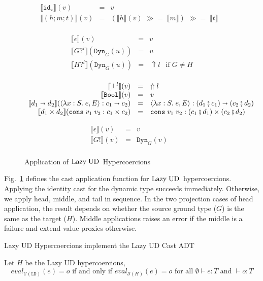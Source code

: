 \documentclass[runningheads]{llncs}
\newcommand{\sidecond}[1]{\text{if}\;#1}
\newcommand{\figequalto}[3]{#1 & = & #2 & #3 \\}
\newcommand{\LUD}{\ensuremath{\text{Lazy\;UD}}}
\newcommand{\CMachine}[1]{\ensuremath{\mathcal{C}(#1)}}
\newcommand{\LDMachine}{\CMachine{\BLD}}
\newcommand{\SMachine}[1]{\ensuremath{\mathcal{S}(#1)}}
\newcommand{\error}[1]{\ensuremath{\Uparrow#1}}
\newcommand{\Tdyn}[0]{\ensuremath{\star}}
\newcommand{\Pbool}[0]{\ensuremath{\mathtt{Bool}}}
\newcommand{\Pfunc}[2]{\ensuremath{#1 \shortrightarrow #2}}
\newcommand{\Pprod}[2]{\ensuremath{#1 \times #2}}
\newcommand{\elam}[3]{\lambda#1:#2.\;#3}
\newcommand{\econs}[2]{\mathtt{cons} \; #1 \; #2}
\newcommand{\ecast}[2]{\ensuremath{#1 : #2}}
\newcommand{\vdyn}[2]{\mathtt{Dyn}_{#1}(#2)}
\newcommand{\vfunc}[4]{\langle\elam{#1}{#2}{#3},#4\rangle}
\newcommand{\vcons}[2]{\econs{#1}{#2}}
\newcommand{\BLD}[0]{\ensuremath{\mathtt{LD}}}
\newcommand{\cnfid}[1]{\ensuremath{\mathtt{id}_{#1}}}
\newcommand{\hcci}[0]{\cnfid{\Tdyn}}
\newcommand{\hccc}[3]{\ensuremath{(#1;#2;#3)}}
\newcommand{\hche}[0]{\ensuremath{\epsilon}}
\newcommand{\hchp}[2]{\ensuremath{#1?^{#2}}}
\newcommand{\hcmbool}[0]{\Pbool}
\newcommand{\hcmfunc}[2]{\Pfunc{#1}{#2}}
\newcommand{\hcmprod}[2]{\Pprod{#1}{#2}}
\newcommand{\hcmfail}[1]{\ensuremath{\bot^l}}
\newcommand{\hcte}[0]{\ensuremath{\epsilon}}
\newcommand{\hcti}[1]{\ensuremath{#1!}}
\newcommand{\mbind}[0]{\ensuremath{\;\gg=\;}}
\newcommand{\denote}[1]{\ensuremath{\llbracket #1 \rrbracket}}
\newcommand{\compose}[2]{\ensuremath{#1 \fatsemi #2}}
\newcommand{\expressiontyping}[3]{\ensuremath{#1 \vdash #2 : #3}}
\newcommand{\valuetyping}[2]{\ensuremath{\vdash #1 : #2}}
\newcommand{\withmachineevalto}[3]{\ensuremath{\mathit{eval}_{#1}(#2)=#3}}
\newcommand{\machineequiv}[2]{
	\ensuremath{
		\withmachineevalto{#1}{e}{o}	
		\text{ if and only if }
		\withmachineevalto{#2}{e}{o}
		\text{ for all }
		\expressiontyping{\emptyset}{e}{T}
		\text{ and }
		\valuetyping{o}{T}
	}}
\begin{document}
\begin{figure}[tp]
	\fbox{$\denote{c}_c(v)=r$}
	\[
	\begin{array}{rclr}
	\figequalto{\denote{\hcci}(v)}{v}{}
	\figequalto{\denote{\hccc{h}{m}{t}}(v)}{
		(\denote{h}(v) \mbind \denote{m})
		\mbind \denote{t}
	}{}
	\end{array}
	\]
	
	\fbox{$\denote{h}_h(v)=r$}
	\[
	\begin{array}{rclr}
	\figequalto{\denote{\hche}(v)}{v}{}
	\figequalto{\denote{\hchp{G}{l}}(\vdyn{G}{u})}{u}{}
	\figequalto{\denote{\hchp{H}{l}}(\vdyn{G}{u})}{\error{l}}{
		\sidecond{G \neq H}
	}
	\end{array}
	\]
	
	\fbox{$\denote{m}_m(v)=r$}
	\[
	\begin{array}{rclr}
	\figequalto{\denote{\hcmfail{l}}(v)}{\error{l}}{}
	\figequalto{\denote{\hcmbool}(v)}{v}{}
	\figequalto{\denote{\hcmfunc{d_1}{d_2}}(\ecast{\vfunc{x}{S}{e}{E}}{\Pfunc{c_1}{c_2}})}{
		\ecast{\vfunc{x}{S}{e}{E}}{\Pfunc{(\compose{d_1}{c_1})}{(\compose{c_2}{d_2})}}
	}{}
	\figequalto{\denote{\hcmprod{d_1}{d_2}}(\ecast{\vcons{v_1}{v_2}}{\Pprod{c_1}{c_2}})}{
		\ecast{\vcons{v_1}{v_2}}{\Pprod{(\compose{c_1}{d_1})}{(\compose{c_2}{d_2})}}
	}{}
	\end{array}
	\]
	
	\fbox{$\denote{t}_t(v)=r$}
	\[
	\begin{array}{rclr}
	\figequalto{\denote{\hcte}(v)}{v}{}
	\figequalto{\denote{\hcti{G}}(v)}{\vdyn{G}{v}}{}
	\end{array}
	\]
	\caption{Application of \LUD\ Hypercoercions}
	\label{fig:LazyUD-Hypercoercions-application}
\end{figure}

Fig.~\ref{fig:LazyUD-Hypercoercions-application} defines the cast application 
function for \LUD\ hypercoercions.
Applying the identity cast for the dynamic type succeeds immediately. 
Otherwise, we apply head, middle, and tail in sequence. 
%
In the two projection cases of head application, the result depends on whether 
the source ground type ($G$) is the same as the target ($H$).
%
Middle applications raises an error if the middle is a failure and extend value 
proxies otherwise.

\begin{proposition} Lazy UD Hypercoercions implement the Lazy UD Cast ADT
\end{proposition}
\begin{theorem} Let $H$ be the Lazy UD 
	hypercoercions,
	\[\machineequiv{\LDMachine}{\SMachine{H}}\]
\end{theorem}
\end{document}
